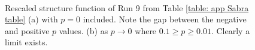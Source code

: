 \begin{figure}[!hpt]
    \\

    \caption{Rescaled structure function of Run 9 from Table \ref{table: app Sabra table} (a) with $p = 0$ included. Note the gap between the negative and positive $p$ values. (b) as $p \rightarrow 0$  where $0.1 \geq p \geq 0.01$. Clearly a limit exists.} \label{fig: at epsilon}
\end{figure}



